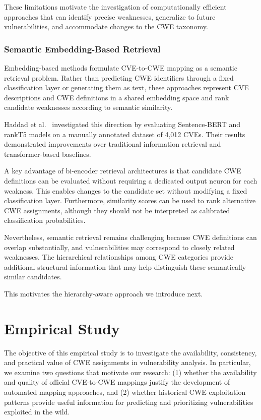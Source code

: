 \documentclass[conference,compsoc]{IEEEtran}
\begin{document}
These limitations motivate the investigation
of computationally efficient approaches
that can identify precise weaknesses,
generalize to future vulnerabilities,
and accommodate changes to the CWE taxonomy.

\subsubsection{Semantic Embedding-Based Retrieval}

Embedding-based methods formulate CVE-to-CWE mapping as a semantic retrieval problem.
Rather than predicting CWE identifiers
through a fixed classification layer or
generating them as text, these approaches
represent CVE descriptions and CWE definitions
in a shared embedding space and rank candidate
weaknesses according to semantic similarity.

Haddad et al.~\cite{haddad2023automated}
investigated this direction by evaluating
Sentence-BERT and rankT5 models on a
manually annotated dataset of 4,012 CVEs.
Their results demonstrated improvements
over traditional information retrieval
and transformer-based baselines.

A key advantage of bi-encoder retrieval
architectures is that candidate CWE
definitions can be evaluated without
requiring a dedicated output neuron for
each weakness. This enables changes to
the candidate set without modifying
a fixed classification layer.
Furthermore, similarity scores can be
used to rank alternative CWE assignments,
although they should not be interpreted
as calibrated classification probabilities.

Nevertheless, semantic retrieval remains
challenging because CWE definitions can
overlap substantially, and vulnerabilities
may correspond to closely related weaknesses.
The hierarchical relationships among
CWE categories provide additional structural
information that may help distinguish
these semantically similar candidates.

This motivates the hierarchy-aware approach
we introduce next.


\section{Empirical Study}
\label{sec:dataset_methodology}

The objective of this empirical study is to investigate
the availability, consistency, and practical value of
CWE assignments in vulnerability analysis. In particular,
we examine two questions that motivate our research:
(1) whether the availability and quality of official
CVE-to-CWE mappings justify the development of automated
mapping approaches, and (2) whether historical CWE
exploitation patterns provide useful information for
predicting and prioritizing vulnerabilities exploited
in the wild.
\end{document}
